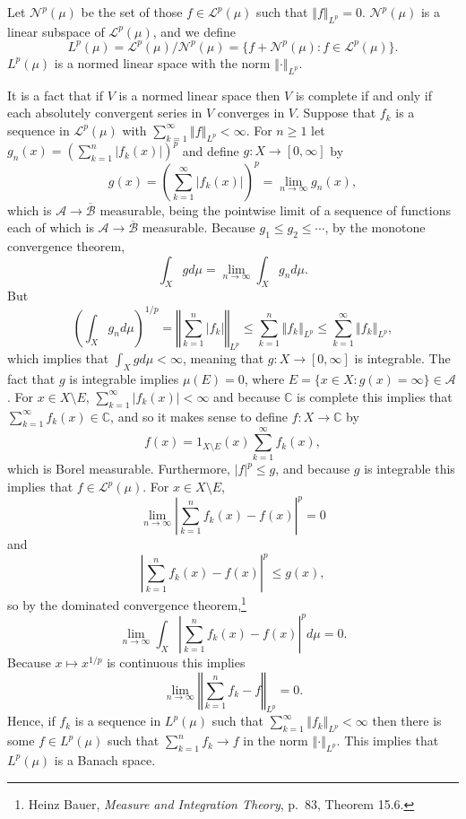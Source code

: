 \documentclass{article}
\newcommand{\norm}[1]{\left\Vert #1 \right\Vert}
\theoremstyle{definition}
\begin{document}
Let $\mathscr{N}^p(\mu)$ be the set of those $f \in \mathscr{L}^p(\mu)$ such that $\norm{f}_{L^p}=0$. 
$\mathscr{N}^p(\mu)$ is a linear subspace of $\mathscr{L}^p(\mu)$, and we define
\[
L^p(\mu)=\mathscr{L}^p(\mu)/\mathscr{N}^p(\mu) = \{f+\mathscr{N}^p(\mu): f \in \mathscr{L}^p(\mu)\}.
\]
$L^p(\mu)$ is a normed linear space with the norm $\norm{\cdot}_{L^p}$.



It is a fact that if $V$ is a normed linear space then $V$ is complete if and only if
each absolutely convergent series in $V$ converges in $V$.
Suppose that $f_k$ is a sequence in $\mathscr{L}^p(\mu)$ with $\sum_{k=1}^\infty \norm{f}_{L^p} < \infty$.
For $n \geq 1$ let $g_n(x) = \left( \sum_{k=1}^n |f_k(x)| \right)^p$ and 
define $g:X \to [0,\infty]$ by
\[
g(x) = \left( \sum_{k=1}^\infty |f_k(x)| \right)^p = \lim_{n \to \infty} g_n(x),
\]
which is $\mathscr{A} \to \overline{\mathscr{B}}$ measurable, being the pointwise limit of a sequence of functions each
of which is $\mathscr{A} \to \overline{\mathscr{B}}$ measurable.
Because $g_1 \leq g_2 \leq \cdots$, 
by the monotone convergence theorem,
\[
\int_X g d\mu = \lim_{n \to \infty} \int_X g_n d\mu.
\]
But
\[
\left( \int_X g_n d\mu \right)^{1/p} = \norm{\sum_{k=1}^n |f_k|}_{L^p} \leq 
\sum_{k=1}^n \norm{f_k}_{L^p} \leq \sum_{k=1}^\infty \norm{f_k}_{L^p},
\]
which implies that 
$\int_X g d\mu < \infty$, meaning that
$g:X \to [0,\infty]$ is integrable. The fact that $g$ is integrable implies $\mu(E)=0$, where
$E=\{x \in X: g(x)=\infty\} \in \mathscr{A}$. For $x \in X \setminus E$, $\sum_{k=1}^\infty |f_k(x)| < \infty$ and because
$\mathbb{C}$ is complete this implies that $\sum_{k=1}^\infty f_k(x) \in \mathbb{C}$, and so it makes sense to define 
 $f:X \to \mathbb{C}$ by
\[
f(x) = 1_{X \setminus E}(x) \sum_{k=1}^\infty f_k(x),
\]
which is Borel measurable. Furthermore, $|f|^p \leq g$, and because $g$ is integrable this implies that
$f \in \mathscr{L}^p(\mu)$. 
For $x \in X \setminus E$,
\[
\lim_{n \to \infty} \left| \sum_{k=1}^n f_k(x) - f(x) \right|^p = 0
\]
and
\[
\left| \sum_{k=1}^n f_k(x)-f(x) \right|^p \leq g(x),
\]
so by the dominated convergence theorem,\footnote{Heinz Bauer, {\em Measure and Integration Theory},
p.~83, Theorem 15.6.}
\[
\lim_{n \to \infty} \int_X \left| \sum_{k=1}^n f_k(x)-f(x) \right|^p d\mu = 0.
\]
Because $x \mapsto x^{1/p}$ is continuous this implies
\[
\lim_{n \to \infty} \norm{ \sum_{k=1}^n f_k - f}_{L^p} = 0.
\]
Hence, if $f_k$ is a sequence in $L^p(\mu)$ such that $\sum_{k=1}^\infty \norm{f_k}_{L^p}<\infty$ then there is
some $f \in L^p(\mu)$ such that $\sum_{k=1}^n f_k \to f$ in the norm $\norm{\cdot}_{L^p}$. This implies that $L^p(\mu)$ is a Banach space.
\end{document}
